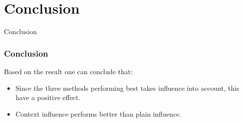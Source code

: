 \section{Conclusion}

\begin{frame}
\begin{center}
     	\huge Conclusion
     \end{center}
\end{frame}

\begin{frame}
	\frametitle{Conclusion}
	Based on the result one can conclude that:
	\begin{itemize}
		\item Since the three methods performing best takes influence into account, this have a positive effect.
		\item Context influence performs better than plain influence.
	\end{itemize}		
	
\end{frame}
